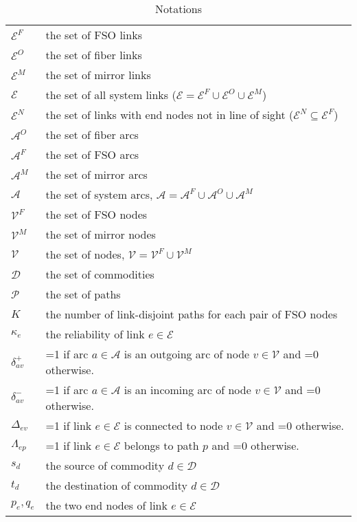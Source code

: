 \documentclass[onecolumn,11pt,draftclsnofoot]{IEEEtran}
\begin{document}
\begin{table}
\centering
\setlength{\tabcolsep}{1pt}
\caption{Notations}
\label{tab:notations}
\begin{tabular}{lp{16cm}}\cline{1-2}
\hline
$\mathcal E^{F}$ & the set of FSO links\\
$\mathcal E^{O}$ & the set of fiber links\\
$\mathcal E^{M}$ & the set of mirror links\\
$\mathcal E$ & the set of all system links ($\mathcal E= \mathcal E^F \cup \mathcal E^O  \cup \mathcal E^M$)\\
$\mathcal E^{N}$ & the set of links with end nodes not in line of sight ($\mathcal E^{N} \subseteq \mathcal E^F$)\\
$\mathcal A^{O}$ & the set of fiber arcs\\
$\mathcal A^{F}$ & the set of FSO arcs\\
$\mathcal A^{M}$ & the set of mirror arcs\\
$\mathcal A$ & the set of system arcs, $\mathcal A= \mathcal A^{F} \cup \mathcal A^{O} \cup \mathcal A^M$\\
$\mathcal V^F$ & the set of FSO nodes \\
$\mathcal V^M$ & the set of mirror nodes \\
$\mathcal V$ & the set of nodes, $\mathcal V= \mathcal V^F \cup \mathcal V^M$\\
$\mathcal D$ & the set of commodities\\
$\mathcal P$ & the set of paths\\
$K$ & the number of link-disjoint paths for each pair of FSO nodes\\
$\kappa_e$ & the reliability of link $e \in \mathcal E$\\
$\delta^+ _{av}$ & =1 if arc $a \in \mathcal A$ is an outgoing arc of node $v \in \mathcal V$ and =0 otherwise.\\
$\delta^- _{av}$ & =1 if arc $a \in \mathcal A$ is an incoming arc of node $v \in \mathcal V$ and =0 otherwise.\\
$\Delta _{ev}$ & =1 if link $e \in \mathcal E$ is connected to node $v \in \mathcal V$ and =0 otherwise.\\
$\Lambda_{ep}$ & =1 if link $e \in \mathcal E$ belongs to path $p$ and =0 otherwise.\\
$s_d$ & the source  of commodity $d \in \mathcal D$\\
$t_d$ & the destination of commodity $d \in \mathcal D$\\
$p_e,q_e$ & the two end nodes of link $e \in \mathcal E$\\

\end{tabular}
\end{table}
\end{document}
